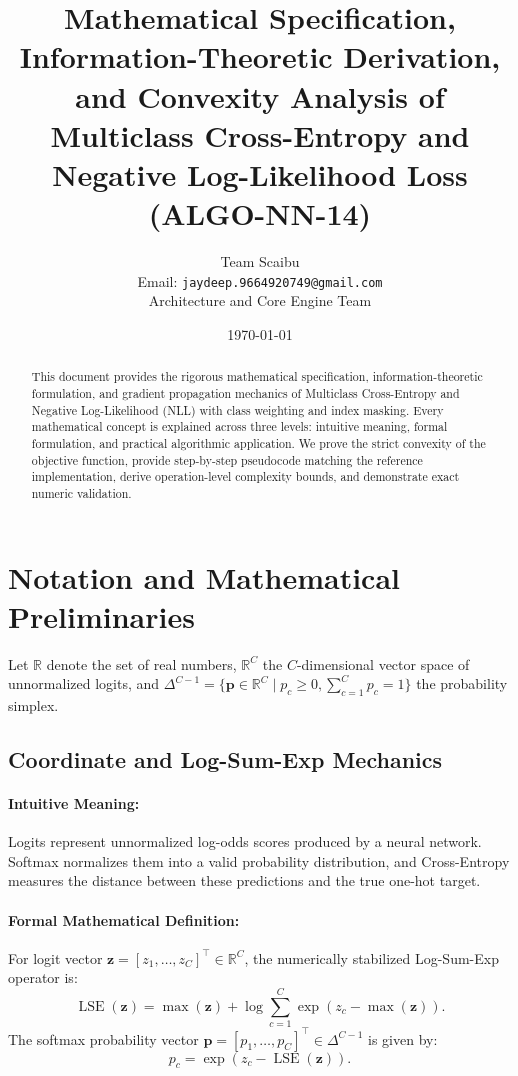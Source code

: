 \documentclass[11pt]{article}
\title{\textbf{Mathematical Specification, Information-Theoretic Derivation, and Convexity Analysis of Multiclass Cross-Entropy and Negative Log-Likelihood Loss (ALGO-NN-14)}}
\author{Team Scaibu \\ \small Email: \texttt{jaydeep.9664920749@gmail.com} \\ \small Architecture and Core Engine Team}
\date{\today}
\begin{document}
\maketitle

\begin{abstract}
This document provides the rigorous mathematical specification, information-theoretic formulation, and gradient propagation mechanics of Multiclass Cross-Entropy and Negative Log-Likelihood (NLL) with class weighting and index masking. Every mathematical concept is explained across three levels: intuitive meaning, formal formulation, and practical algorithmic application. We prove the strict convexity of the objective function, provide step-by-step pseudocode matching the reference implementation, derive operation-level complexity bounds, and demonstrate exact numeric validation.
\end{abstract}

\section{Notation and Mathematical Preliminaries}
\label{sec:notation}

Let $\mathbb{R}$ denote the set of real numbers, $\mathbb{R}^C$ the $C$-dimensional vector space of unnormalized logits, and $\Delta^{C-1} = \{\mathbf{p} \in \mathbb{R}^C \mid p_c \ge 0, \sum_{c=1}^C p_c = 1\}$ the probability simplex.

\subsection{Coordinate and Log-Sum-Exp Mechanics}
\paragraph{Intuitive Meaning:} Logits represent unnormalized log-odds scores produced by a neural network. Softmax normalizes them into a valid probability distribution, and Cross-Entropy measures the distance between these predictions and the true one-hot target.

\paragraph{Formal Mathematical Definition:}
For logit vector $\mathbf{z} = [z_1, \dots, z_C]^\top \in \mathbb{R}^C$, the numerically stabilized Log-Sum-Exp operator is:
\begin{equation}
\operatorname{LSE}(\mathbf{z}) = \max(\mathbf{z}) + \log \sum_{c=1}^C \exp(z_c - \max(\mathbf{z})).
\end{equation}
The softmax probability vector $\mathbf{p} = [p_1, \dots, p_C]^\top \in \Delta^{C-1}$ is given by:
\begin{equation}
p_c = \exp(z_c - \operatorname{LSE}(\mathbf{z})).
\end{equation}
\end{document}
